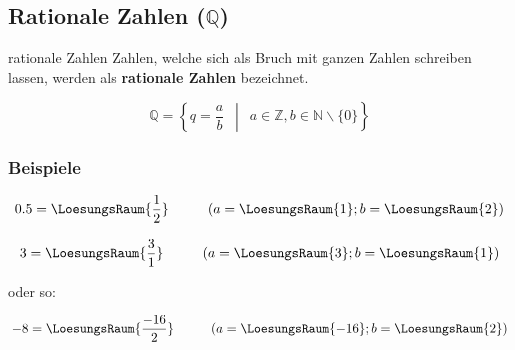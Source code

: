 
\newpage


\subsection{Rationale Zahlen ($\mathbb{Q}$)}

\begin{definition}{rationale Zahlen}{}
Zahlen, welche sich als Bruch mit ganzen Zahlen schreiben lassen,
werden als \textbf{rationale Zahlen} bezeichnet.


$$\mathbb{Q} =\left\{ q = \frac{a}{b} \,\,\, \middle| \,\,\, a \in \mathbb{Z}, b \in \mathbb{N}\backslash{}\{0\}\right\}$$
\end{definition}

\subsubsection{Beispiele}

$$0.5 = \LoesungsRaum{\frac12} \hspace{1cm} (a=\LoesungsRaum{1}; b=\LoesungsRaum{2})$$

$$3 = \LoesungsRaum{\frac31} \hspace{1cm} (a=\LoesungsRaum{3}; b=\LoesungsRaum{1})$$

oder so:

$$-8 = \LoesungsRaum{\frac{-16}{2}} \hspace{1cm} (a=\LoesungsRaum{-16}; b=\LoesungsRaum{2})$$

